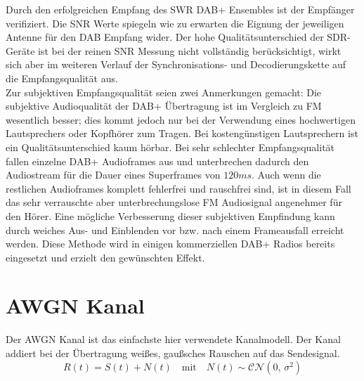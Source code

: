 Durch den erfolgreichen Empfang des SWR DAB+ Ensembles ist der Empfänger verifiziert. Die SNR Werte spiegeln wie zu erwarten die Eignung der jeweiligen Antenne für den DAB Empfang wider. Der hohe Qualitätsunterschied der SDR-Geräte ist bei der reinen SNR Messung nicht vollständig berücksichtigt, wirkt sich aber im weiteren Verlauf der Synchronisations- und Decodierungskette auf die Empfangsqualität aus.\\
Zur subjektiven Empfangsqualität seien zwei Anmerkungen gemacht: Die subjektive Audioqualität der DAB+ Übertragung ist im Vergleich zu FM wesentlich besser; dies kommt jedoch nur bei der Verwendung eines hochwertigen Lautsprechers oder Kopfhörer zum Tragen. Bei kostengünstigen Lautsprechern ist ein Qualitätsunterschied kaum hörbar. Bei sehr schlechter Empfangsqualität fallen einzelne DAB+ Audioframes aus und unterbrechen dadurch den Audiostream für die Dauer eines Superframes von $120 ms$. Auch wenn die restlichen Audioframes komplett fehlerfrei und rauschfrei sind, ist in diesem Fall das sehr verrauschte aber unterbrechungslose FM Audiosignal angenehmer für den Hörer. Eine mögliche Verbesserung dieser subjektiven Empfindung kann durch weiches Aus- und Einblenden vor bzw. nach einem Frameausfall erreicht werden. Diese Methode wird in einigen kommerziellen DAB+ Radios bereits eingesetzt und erzielt den gewünschten Effekt.


\section{AWGN Kanal}
Der \ac{AWGN} Kanal ist das einfachste hier verwendete Kanalmodell. Der Kanal addiert bei der Übertragung weißes, gaußsches Rauschen auf das Sendesignal.
\begin{equation}
R(t) = S(t) + N(t) \quad \text{mit} \quad N(t) \sim \mathcal{C}\mathcal{N}(0,\,\sigma^{2})
\end{equation}

